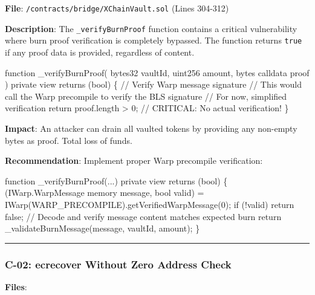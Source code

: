 \documentclass[
]{article}
\newenvironment{Shaded}{}{}
\newcommand{\NormalTok}[1]{#1}
\begin{document}
\textbf{File}: \texttt{/contracts/bridge/XChainVault.sol} (Lines
304-312)

\textbf{Description}: The \texttt{\_verifyBurnProof} function contains a
critical vulnerability where burn proof verification is completely
bypassed. The function returns \texttt{true} if any proof data is
provided, regardless of content.

\begin{Shaded}
\begin{Highlighting}[]
\NormalTok{function \_verifyBurnProof(}
\NormalTok{    bytes32 vaultId,}
\NormalTok{    uint256 amount,}
\NormalTok{    bytes calldata proof}
\NormalTok{) private view returns (bool) \{}
\NormalTok{    // Verify Warp message signature}
\NormalTok{    // This would call the Warp precompile to verify the BLS signature}
\NormalTok{    // For now, simplified verification}
\NormalTok{    return proof.length \textgreater{} 0;  // CRITICAL: No actual verification!}
\NormalTok{\}}
\end{Highlighting}
\end{Shaded}

\textbf{Impact}: An attacker can drain all vaulted tokens by providing
any non-empty bytes as proof. Total loss of funds.

\textbf{Recommendation}: Implement proper Warp precompile verification:

\begin{Shaded}
\begin{Highlighting}[]
\NormalTok{function \_verifyBurnProof(...) private view returns (bool) \{}
\NormalTok{    (IWarp.WarpMessage memory message, bool valid) =}
\NormalTok{        IWarp(WARP\_PRECOMPILE).getVerifiedWarpMessage(0);}
\NormalTok{    if (!valid) return false;}
\NormalTok{    // Decode and verify message content matches expected burn}
\NormalTok{    return \_validateBurnMessage(message, vaultId, amount);}
\NormalTok{\}}
\end{Highlighting}
\end{Shaded}

\begin{center}\rule{0.5\linewidth}{0.5pt}\end{center}

\subsubsection{C-02: ecrecover Without Zero Address
Check}\label{c-02-ecrecover-without-zero-address-check}

\textbf{Files}:
\end{document}
